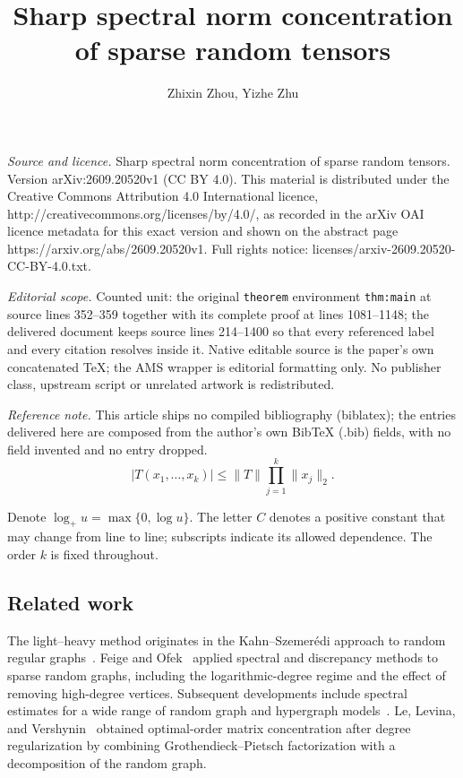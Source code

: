 \documentclass[10pt,a4paper]{amsart}
\numberwithin{equation}{section}
\begin{document}
\title[Sharp spectral norm concentration of sparse random tensors]{Sharp spectral norm concentration of sparse random tensors}
\author{Zhixin Zhou, Yizhe Zhu}
\date{}
\maketitle
\noindent\emph{Source and licence.} Sharp spectral norm concentration of sparse random tensors. Version arXiv:2609.20520v1 (CC BY 4.0). This material is distributed under the Creative Commons Attribution 4.0 International licence, http://creativecommons.org/licenses/by/4.0/, as recorded in the arXiv OAI licence metadata for this exact version and shown on the abstract page https://arxiv.org/abs/2609.20520v1. Full rights notice: licenses/arxiv-2609.20520-CC-BY-4.0.txt.\par\smallskip
\noindent\textit{Editorial scope.} Counted unit: the original \texttt{theorem} environment \texttt{thm:main} at source lines 352--359 together with its complete proof at lines 1081--1148; the delivered document keeps source lines 214--1400 so that every referenced label and every citation resolves inside it. Native editable source is the paper's own concatenated TeX; the AMS wrapper is editorial formatting only. No publisher class, upstream script or unrelated artwork is redistributed.
\par\smallskip\noindent\textit{Reference note.} This article ships no compiled bibliography (biblatex); the entries delivered here are composed from the author's own BibTeX (.bib) fields, with no field invented and no entry dropped.
\begin{equation}\label{eq:homogeneity}
 |T(x_1,\ldots,x_k)|\le\|T\|\prod_{j=1}^k\|x_j\|_2.
\end{equation}


Denote
$\log_+u=\max\{0,\log u\}$. The letter $C$ denotes a positive
constant that may change from line to line; subscripts indicate its
allowed dependence. The order $k$ is fixed throughout.

\subsection{Related work}\label{sec:related}

The light--heavy method originates in the Kahn--Szemer\'edi approach
to random regular graphs~\cite{FKS89}. Feige and Ofek~\cite{FO05} applied spectral
and discrepancy methods to sparse random graphs, including the
logarithmic-degree regime and the effect of removing high-degree
vertices.
Subsequent developments include spectral estimates for a wide range of random graph
and hypergraph models~\cite{BFSU98,LR15,DJPP13,CGJ18,TY19,Z23,DWZ25}.
Le, Levina, and Vershynin~\cite{LLV17} obtained optimal-order matrix
concentration after degree regularization by combining
Grothendieck--Pietsch factorization with a decomposition of the random
graph.
\end{document}
